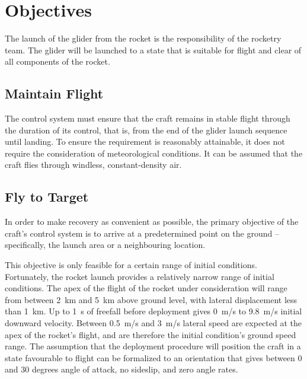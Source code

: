 \documentclass{sydeStyle}
\begin{document}
\chapter{Objectives}
\label{sec:objs}

The launch of the glider from the rocket is the responsibility of the rocketry
team. The glider will be launched to a state that is suitable for flight and
clear of all components of the rocket.

\section{Maintain Flight}
\label{sec:obj1}

The control system must ensure that the craft remains in stable flight through
the duration of its control, that is, from the end of the glider launch sequence
until landing. To ensure the requirement is reasonably attainable, it does not
require the consideration of meteorological conditions. It can be assumed that
the craft flies through windless, constant-density air.

\section{Fly to Target}
\label{sec:obj2}

In order to make recovery as convenient as possible, the primary objective of
the craft's control system is to arrive at a predetermined point on the ground
-- specifically, the launch area or a neighbouring location.

This objective is only feasible for a certain range of initial conditions.
Fortunately, the rocket launch provides a relatively narrow range of initial
conditions. The apex of the flight of the rocket under consideration will
range from between 2~km and 5~km above ground level, with lateral displacement
less than 1~km. Up to 1~s of freefall before deployment gives 0~m/s to 9.8~m/s
initial downward velocity. Between 0.5~m/s and 3~m/s lateral speed are expected
at the apex of the rocket's flight, and are therefore the initial condition's
ground speed range. The assumption that the deployment procedure will position
the craft in a state favourable to flight can be formalized to an orientation
that gives between 0 and 30 degrees angle of attack, no sideslip, and zero
angle rates.
\end{document}
